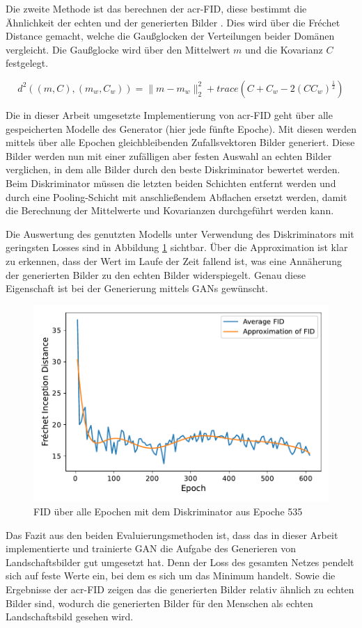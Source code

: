  Die zweite Methode ist das berechnen der \acrfull{acr-FID}, diese bestimmt die Ähnlichkeit der echten und der generierten Bilder \cite{heusel_gans_2017}. Dies wird über die Fr\'echet Distance gemacht, welche die Gaußglocken der Verteilungen beider Domänen vergleicht. Die Gaußglocke wird über den Mittelwert $m$ und die Kovarianz $C$ festgelegt. 
 
 \[d^2((m,C),(m_w,C_w)) =  \|m-m_w\|^2_2 + trace(C+ C_w - 2(CC_w)^{\frac{1}{2}})  \]
 
 Die in dieser Arbeit umgesetzte Implementierung von \gls{acr-FID} geht über alle gespeicherten Modelle des Generator (hier jede fünfte Epoche). Mit diesen werden  
 mittels über alle Epochen gleichbleibenden Zufallsvektoren Bilder generiert. Diese Bilder werden nun mit einer zufälligen aber festen Auswahl an echten Bilder verglichen, in dem alle Bilder durch den beste Diskriminator bewertet werden. Beim Diskriminator müssen die letzten beiden Schichten entfernt werden und durch eine Pooling-Schicht mit anschließendem Abflachen ersetzt werden, damit die Berechnung der Mittelwerte und Kovarianzen durchgeführt werden kann. 
 
 Die Auswertung des genutzten Modells unter Verwendung des Diskriminators mit geringsten Losses sind in Abbildung \ref{fig:plot_fids_gen} sichtbar. Über die Approximation ist klar zu erkennen, dass der Wert im Laufe der Zeit fallend ist, was eine Annäherung der generierten Bilder zu den echten Bilder widerspiegelt. Genau diese Eigenschaft ist bei der Generierung mittels GANs gewünscht.
 
 \begin{figure}
 	\centering
 	\includegraphics[width=0.7\linewidth]{images/plot_line_plot_fids_gen}
 	\caption[FID des generierdene GANs]{FID über alle Epochen mit dem Diskriminator aus Epoche 535}
 	\label{fig:plot_fids_gen}
 \end{figure}
 
 Das Fazit aus den beiden Evaluierungsmethoden ist, dass das in dieser Arbeit implementierte und trainierte GAN die Aufgabe des Generieren von Landschaftsbilder gut umgesetzt hat. Denn der Loss des gesamten Netzes pendelt sich auf feste Werte ein, bei dem es sich um das Minimum handelt.
 Sowie die Ergebnisse der \gls{acr-FID} zeigen das die generierten Bilder relativ ähnlich zu echten Bilder sind, wodurch die generierten Bilder für den Menschen als echten Landschaftsbild gesehen wird.
 
 